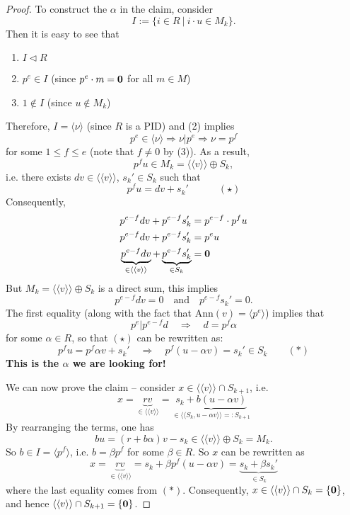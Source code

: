\documentclass[11pt,openany]{book}
\theoremstyle{plain}
\theoremstyle{definition}
\theoremstyle{remark}
\begin{document}
\begin{proof}
    To construct the $\alpha$ in the claim, consider 
    $$I:=\{i\in R\ |\ i\cdot u\in M_k\}.$$
    Then it is easy to see that
    \begin{enumerate}
        \item $I\lhd R$ 
        \item $p^e\in I$ (since $p^e \cdot m = {\bf 0}$ for all $m \in M$)
        \item $1 \not\in I$ (since $u\notin M_k$)
    \end{enumerate}
    Therefore, $I = \langle \nu \rangle$ (since $R$ is a PID) and (2) implies 
    $$p^e \in \langle \nu \rangle \Rightarrow \nu|p^e \Rightarrow \nu = p^f$$
    for some $1 \leq f \leq e$ (note that $f \neq 0$ by (3)). As a result, 
    $$p^{f}u \in M_k =\langle\langle v \rangle\rangle \oplus S_k,$$ 
    i.e. there exists $dv \in \langle \langle v \rangle \rangle$, $s_k' \in S_k$ such that
    $$p^{f}u=dv+s_k' \quad \quad \quad (\star)$$
    Consequently,
    \begin{align*}
    p^{e-f}dv+p^{e-f}s_k' &= p^{e-f}\cdot p^{f}u \\
    p^{e-f}dv+p^{e-f}s_k' &= p^{e}u \\
    \underbrace{p^{e-f}dv}_{\in \langle \langle v \rangle \rangle} + \underbrace{p^{e-f}s_k'}_{\in S_k} &= {\bf 0}
    \end{align*}
    But $M_k = \langle\langle v \rangle\rangle \oplus S_k$ is a direct sum, this implies
    $${p^{e-f}d}v=0 \quad \text{and} \quad p^{e-f}s_k'=0.$$
    The first equality (along with the fact that $\mathrm{Ann}(v) = \langle p^e \rangle$) implies that
        $$p^e|p^{e-f}d \quad \Rightarrow \quad d=p^f\alpha$$
    for some $\alpha \in R$, so that $(\star)$ can be rewritten as:
    $$p^f u = p^f\alpha v + s_k' \quad \Rightarrow \quad p^f(u-\alpha v) = s_k' \in S_k \quad \quad (\ast)$$
    {\bf This is the $\alpha$ we are looking for!} 

    \medskip
    We can now prove the claim -- consider 
    $x\in \langle\langle v\rangle\rangle \cap S_{k+1}$, i.e. 
    $$x= \underbrace{rv}_{\in \langle \langle v \rangle \rangle} = \underbrace{s_k+b(u-\alpha v)}_{\in \langle \langle S_k, u-\alpha v\rangle \rangle =: S_{k+1}}$$
    By rearranging the terms, one has
    $$bu = (r + b\alpha) v - s_k \in \langle \langle v \rangle \rangle \oplus S_k = M_k.$$
    So $b \in I = \langle p^f \rangle$, i.e. $b = \beta p^f$ for some $\beta \in R$. So $x$ can be rewritten as
    $$x= \underbrace{rv}_{\in \langle \langle v \rangle \rangle} = s_k+\beta p^f(u-\alpha v) = \underbrace{s_k + \beta s_k'}_{\in S_k}$$
    where the last equality comes from $(\ast)$. Consequently, $x \in \langle \langle v \rangle \rangle \cap S_k = \{\bf 0\}$, and hence
    $\langle \langle v \rangle \rangle \cap S_{k+1} = \{\bf 0\}$.
    

\end{proof}
\end{document}
